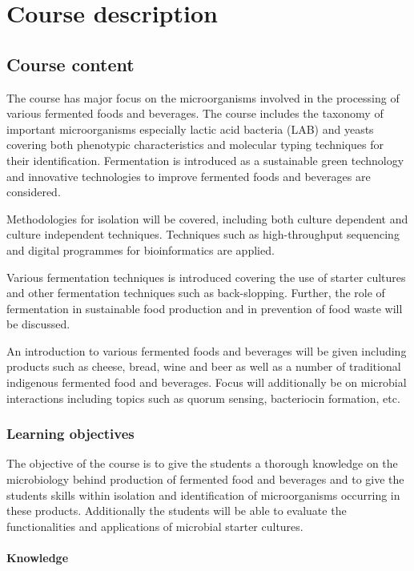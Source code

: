 \chapter{Course description}

\section{Course content}

The course has major focus on the microorganisms involved in the processing of various fermented foods and beverages. The course includes the taxonomy of important microorganisms especially lactic acid bacteria (LAB) and yeasts covering both phenotypic characteristics and molecular typing techniques for their identification. Fermentation is introduced as a sustainable green technology and innovative technologies to improve fermented foods and beverages are considered.

Methodologies for isolation will be covered, including both culture dependent and culture independent techniques. Techniques such as high-throughput sequencing and digital programmes for bioinformatics are applied.

Various fermentation techniques is introduced covering the use of starter cultures and other fermentation techniques such as back-slopping. Further, the role of fermentation in sustainable food production and in prevention of food waste will be discussed.

An introduction to various fermented foods and beverages will be given including products such as cheese, bread, wine and beer as well as a number of traditional indigenous fermented food and beverages. Focus will additionally be on microbial interactions including topics such as quorum sensing, bacteriocin formation, etc.

\subsection{Learning objectives}

The objective of the course is to give the students a thorough knowledge on the microbiology behind production of fermented food and beverages and to give the students skills within isolation and identification of microorganisms occurring in these products. Additionally the students will be able to evaluate the functionalities and applications of microbial starter cultures.

\subsubsection{Knowledge}


